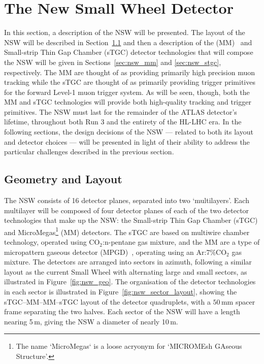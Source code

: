 \section{The New Small Wheel Detector}
\label{sec:nsw_detector}

In this section, a description of the NSW will be presented.
The layout of the NSW will be described in Section~\ref{sec:nsw_geo}
and then a description of the \micromegas (MM)~\cite{Giomataris:1995fq} and Small-strip Thin Gap Chamber (sTGC)
detector technologies that will compose the NSW
will be given in Sections~\ref{sec:nsw_mm} and \ref{sec:nsw_stgc}, respectively.
The MM are thought of as providing primarily high precision muon tracking
while the sTGC are thought of as primarily providing trigger primitives for the forward Level-1 muon trigger system.
As will be seen, though, both the MM and sTGC technologies will provide both high-quality tracking and trigger primitives.
The NSW must last for the remainder of the ATLAS detector's lifetime, throughout
both Run 3 and the entirety of the HL-LHC era.
In the following sections, the design decisions of the NSW --- related to both its layout 
and detector choices --- will be presented in light of their ability to address
the particular challenges described in the previous section.

\subsection{Geometry and Layout}
\label{sec:nsw_geo}

The NSW consists of 16 detector planes, separated into two `multilayers'.
Each multilayer will be composed of four detector planes of each of the two
detector technologies that make up the NSW: the Small-strip Thin Gap Chamber (sTGC)
and MicroMegas\footnote{The name `MicroMegas` is a loose acryonym for `MICROMEsh GAseous Structure'.} (MM)
detectors.
The sTGC are based on multiwire chamber technology, operated using CO$_2$:n-pentane gas mixture, and the MM are a type of
micropattern gaseous detector (MPGD)~\cite{MPGD}, operating using an Ar:7\%CO$_2$ gas mixture.
The detectors are arranged into sectors in azimuth, following a similar layout
as the current Small Wheel with alternating large and small sectors, as illustrated in Figure~\ref{fig:nsw_geo}.
The organisation of the detector technologies in each sector is illustrated in Figure~\ref{fig:nsw_sector_layout},
showing the sTGC--MM--MM--sTGC layout of the detector quadruplets, with a $50$\,mm spacer
frame separating the two halves.
Each sector of the NSW will have a length nearing 5\,m, giving the NSW a diameter of
nearly 10\,m.

